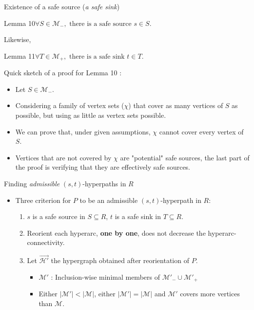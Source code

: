 \documentclass[10pt, aspectratio=43]{beamer}
\begin{document}
	\begin{frame}{Existence of a safe source (\textit{a safe sink})}
		\begin{block}{Lemma 10}$\forall{S}\in\mathcal{M}_{-}, \text{ there is a safe source }s\in{S}.$\end{block}
		Likewise,
		\begin{block}{Lemma 11}$\forall{T}\in\mathcal{M}_{+}, \text{ there is a safe sink }t\in{T}.$\end{block}

		\begin{block}
			{Quick sketch of a proof for \textsf{Lemma 10} :}
			\begin{itemize}
				\item Let $S\in\mathcal{M}_{-}$.
				\item Considering a family of vertex sets ($\chi$) that cover as many vertices of $S$ as possible, but using as little as vertex sets possible.
				\item We can prove that, under given assumptions, $\chi$ cannot cover every vertex of $S$.
				\item Vertices that are not covered by $\chi$ are "potential" safe sources, the last part of the proof is verifying that they are effectively safe sources.
			\end{itemize}
		\end{block}
	\end{frame}

	\begin{frame}{Finding \textit{admissible} $(s, t)$-hyperpaths in $R$}
		\begin{itemize}
			\item Three criterion for $P$ to be an admissible $(s, t)$-hyperpath in $R$:
			\begin{enumerate}
				\item $s$ is a safe source in $S\subseteq{R}$, $t$ is a safe sink in $T\subseteq{R}$.
				\item Reorient each hyperarc, \textbf{one by one}, does not decrease the hyperarc-connectivity.
				\item Let $\vec{\mathcal{H}'}$ the hypergraph obtained after reorientation of $P$.\begin{itemize}
					\item $\mathcal{M}'$ : Inclusion-wise minimal members of $\mathcal{M}'_{-}\cup\mathcal{M}'_{+}$
					\item Either $|\mathcal{M}'| < |\mathcal{M}|$, either $|\mathcal{M}'| = |\mathcal{M}|$ and $\mathcal{M}'$ covers more vertices than $\mathcal{M}$.
				\end{itemize}
			\end{enumerate}
		\end{itemize}
	\end{frame}
\end{document}

